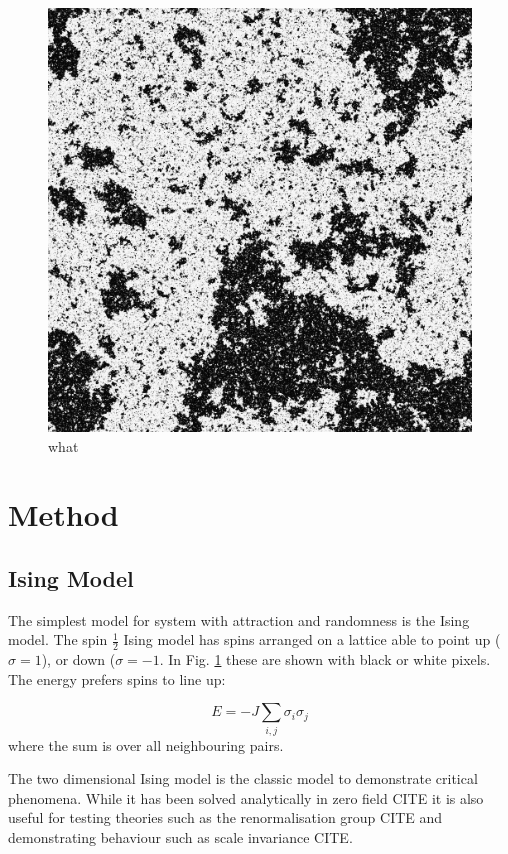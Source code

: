 \documentclass[aps,prl,reprint,groupedaddress, showpacs]{revtex4-1}
\begin{document}
\begin{figure}
\includegraphics[width=\columnwidth]{data/swolff0000.png}
\caption{\label{fig-config} what}
\end{figure}

\section{Method\label{sec-method}}

\subsection{Ising Model}

The simplest model for system with attraction and randomness is the Ising model. The spin $\frac{1}{2}$ Ising model has spins arranged on a lattice able to point up ($\sigma = 1$), or down ($\sigma = -1$. In Fig. \ref{fig-config} these are shown with black or white pixels. The energy prefers spins to line up:

\begin{equation}
E = -J \sum_{i, j} \sigma_i \sigma_j
\end{equation}
where the sum is over all neighbouring pairs.

The two dimensional Ising model is the classic model to demonstrate critical phenomena. While it has been solved analytically in zero field CITE it is also useful for testing theories such as the renormalisation group CITE and demonstrating behaviour such as scale invariance CITE.
\end{document}

